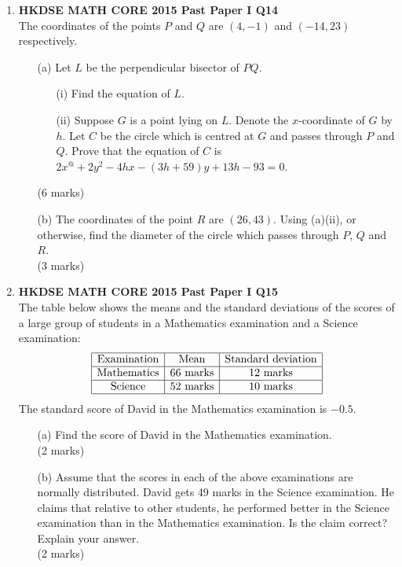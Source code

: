 \documentclass[12pt]{article}
\begin{document}
\begin{enumerate}
	\item \textbf{HKDSE MATH CORE 2015 Past Paper I Q14}\\
	The coordinates of the points $P$ and $Q$ are $(4, -1)$ and $(-14, 23)$ respectively.
	\begin{enumerate}
		\item[(a)] Let $L$ be the perpendicular bisector of $PQ$.
		\begin{enumerate}
			\item[(i)] Find the equation of $L$.
			\item[(ii)] Suppose $G$ is a point lying on $L$. Denote the $x$-coordinate of $G$ by $h$. Let $C$ be the circle which is centred at $G$ and passes through $P$ and $Q$. Prove that the equation of $C$ is $2x^@ + 2y^2 -4hx -(3h+59)y + 13h - 93 = 0$.
		\end{enumerate}
		(6 marks)
		\item[(b)] The coordinates of the point $R$ are $(26, 43)$. Using (a)(ii), or otherwise, find the diameter of the circle which passes through $P$, $Q$ and $R$. \\(3 marks)
	\end{enumerate}

	\item \textbf{HKDSE MATH CORE 2015 Past Paper I Q15}\\
	The table below shows the means and the standard deviations of the scores of a large group of students in a Mathematics examination and a Science examination:
	$$\begin{array}{|c|c|c|}
		\hline
		\text{Examination} & \text{Mean} & \text{Standard deviation} \\
		\hline
		\text{Mathematics} & \text{66 marks} & \text{12 marks} \\
		\hline		
		\text{Science} & \text{52 marks} & \text{10 marks} \\
		\hline
	\end{array}$$
	The standard score of David in the Mathematics examination is $-0.5$.
	\begin{enumerate}
		\item[(a)] Find the score of David in the Mathematics examination. \\(2 marks)
		\item[(b)] Assume that the scores in each of the above examinations are normally distributed. David gets 49 marks in the Science examination. He claims that relative to other students, he performed better in the Science examination than in the Mathematics examination. Is the claim correct? Explain your answer. \\(2 marks)
	\end{enumerate}


\end{enumerate}
\end{document}
